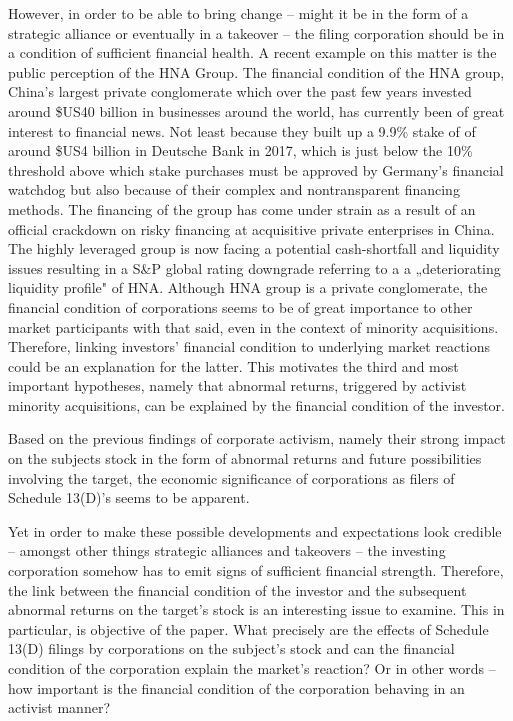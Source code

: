 \documentclass[12pt]{article}
\begin{document}
However, in order to be able to bring change -- might it be in the form of a strategic alliance or eventually in a takeover -- the filing corporation should be in a condition of sufficient financial health. 
A recent example on this matter is the public perception of the HNA Group. The financial condition of the HNA group, China's largest private conglomerate which over the past few years invested around \$US40 billion in businesses around the world, has currently been of great interest to financial news. Not least because they built up a 9.9\% stake of of around \$US4 billion in Deutsche Bank in 2017, which is just below the 10\% threshold above which stake purchases must be approved by Germany's financial watchdog but also because of their complex and nontransparent financing methods.
The financing of the group has come under strain as a result of an official crackdown on risky financing at acquisitive private enterprises in China. The highly leveraged group is now facing a potential cash-shortfall and liquidity issues resulting in a S\&P global rating downgrade referring to a a „deteriorating liquidity profile" of HNA. Although HNA group is a private conglomerate, the financial condition of corporations seems to be of great importance to other market participants with that said, even in the context of minority acquisitions. Therefore, linking investors' financial condition to  underlying market reactions could be an explanation for the latter. This motivates the third and most important hypotheses, namely that abnormal returns, triggered by activist minority acquisitions, can be explained by the financial condition of the investor. 


Based on the previous findings of corporate activism, namely their strong impact on the subjects stock in the form of abnormal returns and future possibilities involving the target, the economic significance of corporations as filers of Schedule 13(D)'s seems to be apparent.

Yet in order to make these possible developments and expectations look credible -- amongst other things strategic alliances and takeovers -- the investing corporation somehow has to emit signs of sufficient financial strength. Therefore, the link between the financial condition of the investor and the subsequent abnormal returns on the target's stock is an interesting issue to examine. This in particular, is objective of the paper. What precisely are the effects of Schedule 13(D) filings by corporations on the subject's stock and can the financial condition of the corporation explain the market's reaction? Or in other words -- how important is the financial condition of the corporation behaving in an activist manner? 
\end{document}
